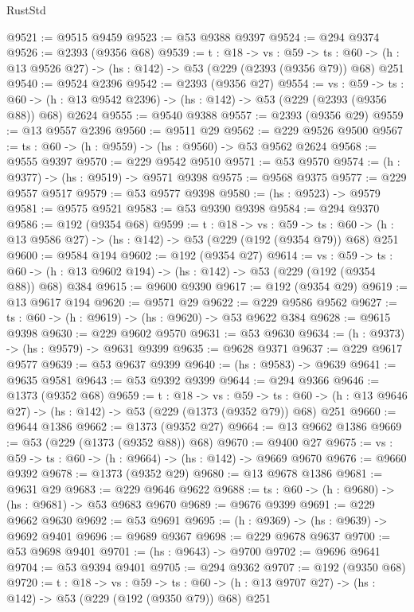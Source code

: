 \begin{lexlean}{RustStd}
\begin{coremodule}
@9521 := @9515 @9459
@9523 := @53 @9388 @9397
@9524 := @294 @9374
@9526 := @2393 (@9356 @68)
@9539 := {t : @18} ->
  {vs : @59} ->
  {ts : @60} -> (h : @13 @9526 @27) -> (hs : @142) -> @53 (@229 (@2393 (@9356 @79)) @68) @251
@9540 := @9524 @2396
@9542 := @2393 (@9356 @27)
@9554 := {vs : @59} ->
  {ts : @60} -> (h : @13 @9542 @2396) -> (hs : @142) -> @53 (@229 (@2393 (@9356 @88)) @68) @2624
@9555 := @9540 @9388
@9557 := @2393 (@9356 @29)
@9559 := @13 @9557 @2396
@9560 := @9511 @29
@9562 := @229 @9526 @9500
@9567 := {ts : @60} -> (h : @9559) -> (hs : @9560) -> @53 @9562 @2624
@9568 := @9555 @9397
@9570 := @229 @9542 @9510
@9571 := @53 @9570
@9574 := (h : @9377) -> (hs : @9519) -> @9571 @9398
@9575 := @9568 @9375
@9577 := @229 @9557 @9517
@9579 := @53 @9577 @9398
@9580 := (hs : @9523) -> @9579
@9581 := @9575 @9521
@9583 := @53 @9390 @9398
@9584 := @294 @9370
@9586 := @192 (@9354 @68)
@9599 := {t : @18} ->
  {vs : @59} ->
  {ts : @60} -> (h : @13 @9586 @27) -> (hs : @142) -> @53 (@229 (@192 (@9354 @79)) @68) @251
@9600 := @9584 @194
@9602 := @192 (@9354 @27)
@9614 := {vs : @59} ->
  {ts : @60} -> (h : @13 @9602 @194) -> (hs : @142) -> @53 (@229 (@192 (@9354 @88)) @68) @384
@9615 := @9600 @9390
@9617 := @192 (@9354 @29)
@9619 := @13 @9617 @194
@9620 := @9571 @29
@9622 := @229 @9586 @9562
@9627 := {ts : @60} -> (h : @9619) -> (hs : @9620) -> @53 @9622 @384
@9628 := @9615 @9398
@9630 := @229 @9602 @9570
@9631 := @53 @9630
@9634 := (h : @9373) -> (hs : @9579) -> @9631 @9399
@9635 := @9628 @9371
@9637 := @229 @9617 @9577
@9639 := @53 @9637 @9399
@9640 := (hs : @9583) -> @9639
@9641 := @9635 @9581
@9643 := @53 @9392 @9399
@9644 := @294 @9366
@9646 := @1373 (@9352 @68)
@9659 := {t : @18} ->
  {vs : @59} ->
  {ts : @60} -> (h : @13 @9646 @27) -> (hs : @142) -> @53 (@229 (@1373 (@9352 @79)) @68) @251
@9660 := @9644 @1386
@9662 := @1373 (@9352 @27)
@9664 := @13 @9662 @1386
@9669 := @53 (@229 (@1373 (@9352 @88)) @68)
@9670 := @9400 @27
@9675 := {vs : @59} -> {ts : @60} -> (h : @9664) -> (hs : @142) -> @9669 @9670
@9676 := @9660 @9392
@9678 := @1373 (@9352 @29)
@9680 := @13 @9678 @1386
@9681 := @9631 @29
@9683 := @229 @9646 @9622
@9688 := {ts : @60} -> (h : @9680) -> (hs : @9681) -> @53 @9683 @9670
@9689 := @9676 @9399
@9691 := @229 @9662 @9630
@9692 := @53 @9691
@9695 := (h : @9369) -> (hs : @9639) -> @9692 @9401
@9696 := @9689 @9367
@9698 := @229 @9678 @9637
@9700 := @53 @9698 @9401
@9701 := (hs : @9643) -> @9700
@9702 := @9696 @9641
@9704 := @53 @9394 @9401
@9705 := @294 @9362
@9707 := @192 (@9350 @68)
@9720 := {t : @18} ->
  {vs : @59} ->
  {ts : @60} -> (h : @13 @9707 @27) -> (hs : @142) -> @53 (@229 (@192 (@9350 @79)) @68) @251

\end{coremodule}
\end{lexlean}
